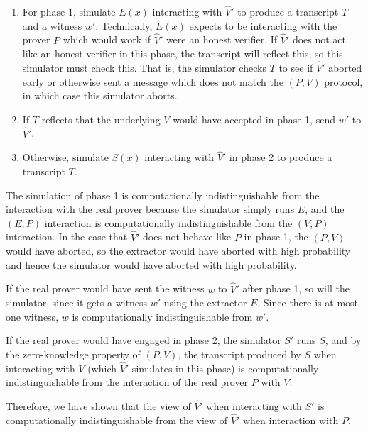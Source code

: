 \documentclass[draft]{article}
\begin{document}
\begin{enumerate}
\begin{description}
\begin{enumerate}
    \item
      For phase 1, simulate $E(x)$ interacting with $\hat{V}'$ to produce a transcript $T$ and a witness $w'$.
      Technically, $E(x)$ expects to be interacting with the prover $P$ which would work if $\hat{V}'$ were an honest verifier.
      If $\hat{V}'$ does not act like an honest verifier in this phase, the transcript will reflect this, so this simulator must check this.
      That is, the simulator checks $T$ to see if $\hat{V}'$ aborted early or otherwise sent a message which does not match the $(P, V)$ protocol, in which case this simulator aborts.
    \item If $T$ reflects that the underlying $V$ would have accepted in phase 1, send $w'$ to $\hat{V}'$.
    \item Otherwise, simulate $S(x)$ interacting with $\hat{V}'$ in phase 2 to produce a transcript $T$.
    \end{enumerate}

    The simulation of phase 1 is computationally indistinguishable from the interaction with the real prover because the simulator simply runs $E$, and the $(E, P)$ interaction is computationally indistinguishable from the $(V, P)$ interaction.
    In the case that $\hat{V}'$ does not behave like $P$ in phase 1, the $(P, V)$ would have aborted, so the extractor would have aborted with high probability and hence the simulator would have aborted with high probability.

    If the real prover would have sent the witness $w$ to $\hat{V}'$ after phase 1, so will the simulator, since it gets a witness $w'$ using the extractor $E$.
    Since there is at most one witness, $w$ is computationally indistinguishable from $w'$.
    
    If the real prover would have engaged in phase 2, the simulator $S'$ runs $S$, and by the zero-knowledge property of $(P, V)$, the transcript produced by $S$ when interacting with $V$ (which $\hat{V}'$ simulates in this phase) is computationally indistinguishable from the interaction of the real prover $P$ with $V$.

    Therefore, we have shown that the view of $\hat{V}'$ when interacting with $S'$ is computationally indistinguishable from the view of $\hat{V}'$ when interaction with $P$.
  \end{description}


\end{enumerate}
\end{document}
